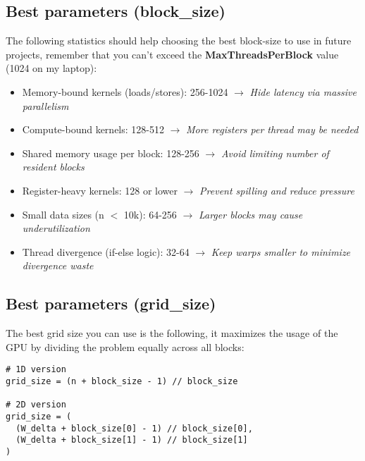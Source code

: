 \documentclass{article}
\begin{document}
\subsection{Best parameters (block\_size)} The following statistics should help choosing the best block-size to use in future projects, remember that you can't exceed the \textbf{MaxThreadsPerBlock} value (1024 on my laptop):
\begin{itemize}
    \item Memory-bound kernels (loads/stores): 256-1024 $\longrightarrow$ \textit{Hide latency via massive parallelism}
    \item Compute-bound kernels: 128-512 $\longrightarrow$ \textit{More registers per thread may be needed}
    \item Shared memory usage per block: 128-256 $\longrightarrow$ \textit{Avoid limiting number of resident blocks}
    \item Register-heavy kernels: 128 or lower $\longrightarrow$ \textit{Prevent spilling and reduce pressure}
    \item Small data sizes (n $<$ 10k): 64-256 $\longrightarrow$ \textit{Larger blocks may cause underutilization}
    \item Thread divergence (if-else logic): 32-64 $\longrightarrow$ \textit{Keep warps smaller to minimize divergence waste}
\end{itemize}


\subsection{Best parameters (grid\_size)} The best grid size you can use is the following, it maximizes the usage of the GPU by dividing the problem equally across all blocks:
\begin{lstlisting}[caption=Determine grid size]
# 1D version
grid_size = (n + block_size - 1) // block_size 

# 2D version
grid_size = (
  (W_delta + block_size[0] - 1) // block_size[0],
  (W_delta + block_size[1] - 1) // block_size[1]
) 
\end{lstlisting}
\end{document}
